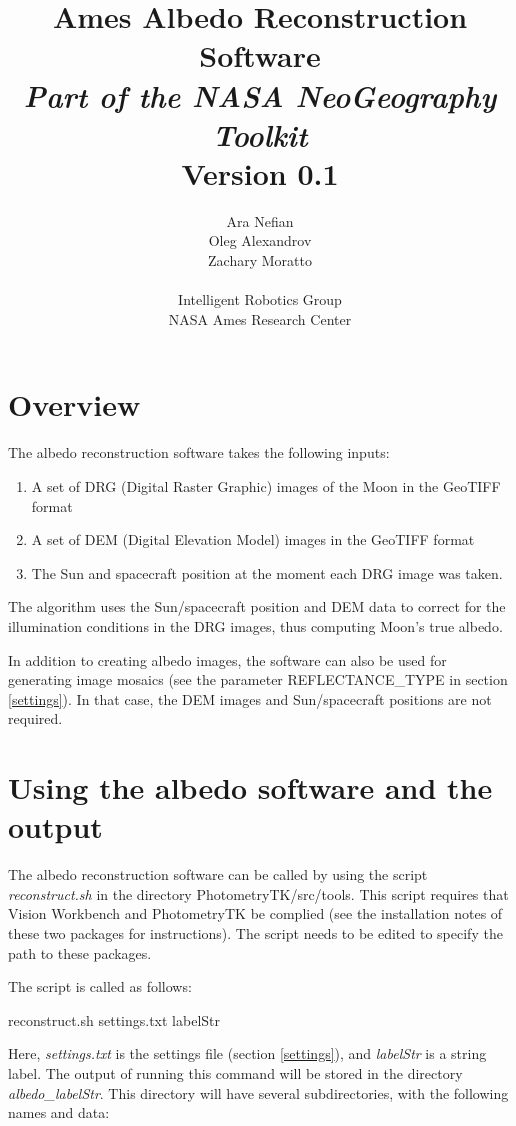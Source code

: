 \documentclass[letterpaper,fleqn,11pt]{report}
\title{{\Huge Ames Albedo Reconstruction Software}\\
{\em Part of the NASA NeoGeography Toolkit}\\
Version 0.1}
\author{
Ara Nefian\\
Oleg Alexandrov\\
Zachary Moratto\\
\\
Intelligent Robotics Group\\
NASA Ames Research Center\\
}
\begin{document}
\maketitle
%
\tableofcontents



\newpage

\section{Overview}\label{overview}

The albedo reconstruction software takes the following inputs:
\begin{enumerate}
\item A set of DRG (Digital Raster Graphic) images of the Moon in the GeoTIFF format
\item A set of DEM (Digital Elevation Model) images in the GeoTIFF format
\item The Sun and spacecraft position at the moment each DRG image was
  taken. 
\end{enumerate}

The algorithm uses the Sun/spacecraft position and DEM data to
correct for the illumination conditions in the DRG images, thus
computing Moon's true albedo. 

In addition to creating albedo images, the software can also be used
for generating image mosaics (see the parameter REFLECTANCE\_TYPE in
section \ref{settings}). In that case, the DEM images and Sun/spacecraft positions are
not required.

\section{Using the albedo software and the output}

The albedo reconstruction software can be called by using the script
{\it reconstruct.sh} in the directory PhotometryTK/src/tools. This
script requires that Vision Workbench and PhotometryTK be complied (see
the installation notes of these two packages for instructions). The
script needs to be edited to specify the path to these packages.

The script is called as follows:

reconstruct.sh settings.txt labelStr

Here, {\it settings.txt} is the settings file (section \ref{settings}), and
{\it labelStr} is a string label. The output of running this command will be
stored in the directory {\it albedo\_labelStr}. This directory will have several subdirectories, with the following names and data:
\end{document}
